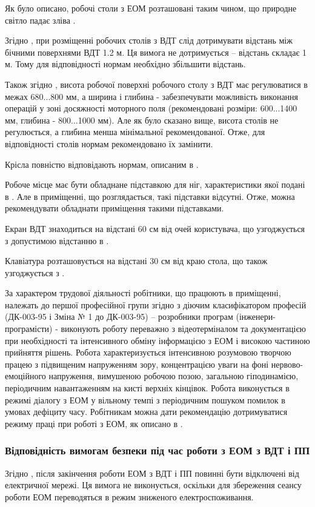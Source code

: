 \documentclass[a4paper,12pt]{article}
\begin{document}
Як було описано, робочі столи з ЕОМ розташовані таким чином, що природне світло падає зліва \cite{sanpin798}.

Згідно \cite{sanpin798}, при розміщенні робочих столів з ВДТ слід дотримувати відстань між бічними поверхнями ВДТ 1.2 м. Ця вимога не дотримується -- відстань складає 1 м. Тому для відповідності нормам необхідно збільшити відстань.

Також згідно \cite{sanpin798}, висота робочої поверхні робочого столу з ВДТ має регулюватися в межах 680...800 мм, а ширина і глибина - забезпечувати можливість виконання операцій у зоні досяжності моторного поля (рекомендовані розміри: 600...1400 мм, глибина - 800...1000 мм). Але як було сказано вище, висота столів не регулюється, а глибина менша мінімальної рекомендованої. Отже, для відповідності столів нормам рекомендовано їх замінити.

Крісла повністю відповідають нормам, описаним в \cite{sanpin798}.

Робоче місце має бути обладнане підставкою для ніг, характеристики якої подані в \cite{sanpin798}. Але в приміщенні, що розглядається, такі підставки відсутні. Отже, можна рекомендувати обладнати приміщення такими підставками.

Екран ВДТ знаходиться на відстані 60 см від очей користувача, що узгоджується з допустимою відстанню в \cite{sanpin798}.

Клавіатура розташовується на відстані 30 см від краю стола, що також узгоджується з \cite{sanpin798}.

За характером трудової діяльності робітники, що працюють в приміщенні, належать до першої професійної групи згідно з діючим класифікатором професій (ДК-003-95 і Зміна № 1 до ДК-003-95) -- розробники програм (інженери-програмісти) - виконують роботу переважно з відеотерміналом та документацією при необхідності та інтенсивного обміну інформацією з ЕОМ і високою частиною прийняття рішень. Робота характеризується інтенсивною розумовою творчою працею з підвищеним напруженням зору, концентрацією уваги на фоні нервово-емоційного напруження, вимушеною робочою позою, загальною гіподинамією, періодичним навантаженням на кисті верхніх кінцівок. Робота виконується в режимі діалогу з ЕОМ у вільному темпі з періодичним пошуком помилок в умовах дефіциту часу. Робітникам можна дати рекомендацію дотримуватися режиму праці при роботі з ЕОМ, як описано в \cite{sanpin798}.

\subsubsection{Відповідність вимогам безпеки під час роботи з ЕОМ з ВДТ і ПП}
Згідно \cite{npaop1210}, після закінчення роботи ЕОМ з ВДТ і ПП повинні бути відключені від електричної мережі. Ця вимога не виконується, оскільки для збереження сеансу роботи ЕОМ переводяться в режим зниженого електроспоживання.
\end{document}
